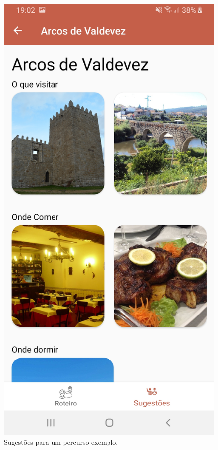 \begin{figure}[H]
\centering
\includegraphics[width=0.5\linewidth]{images/sugestoes.jpg}
\caption{Sugestões para um percurso exemplo.}
\end{figure}